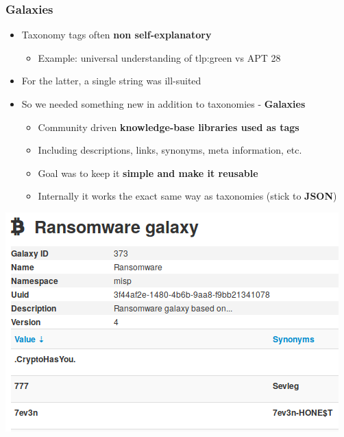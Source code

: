 \begin{frame}
\frametitle{Galaxies}
    \begin{itemize}
      \item Taxonomy tags often {\bf non self-explanatory}
      \begin{itemize}
       \item Example: universal understanding of tlp:green vs APT 28
      \end{itemize}
       \item For the latter, a single string was ill-suited
       \item So we needed something new in addition to taxonomies - \textbf{Galaxies}
        \begin{itemize}
            \item Community driven \textbf{knowledge-base libraries used as tags}
            \item Including descriptions, links, synonyms, meta information, etc. 
            \item Goal was to keep it \textbf{simple and make it reusable}
            \item Internally it works the exact same way as taxonomies (stick to \textbf{JSON})
        \end{itemize}
    \end{itemize}
    \begin{center}
        \hspace{10em}
        \includegraphics[scale=0.30]{galaxy-ransomware.png}
    \end{center}
\end{frame}

